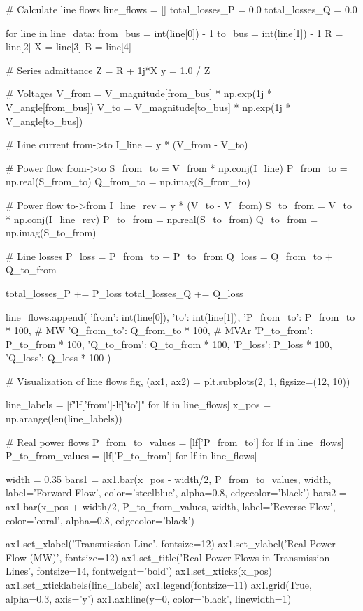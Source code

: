 \documentclass[11pt,a4paper]{article}
\begin{document}
\begin{pycode}
# Calculate line flows
line_flows = []
total_losses_P = 0.0
total_losses_Q = 0.0

for line in line_data:
    from_bus = int(line[0]) - 1
    to_bus = int(line[1]) - 1
    R = line[2]
    X = line[3]
    B = line[4]

    # Series admittance
    Z = R + 1j*X
    y = 1.0 / Z

    # Voltages
    V_from = V_magnitude[from_bus] * np.exp(1j * V_angle[from_bus])
    V_to = V_magnitude[to_bus] * np.exp(1j * V_angle[to_bus])

    # Line current from->to
    I_line = y * (V_from - V_to)

    # Power flow from->to
    S_from_to = V_from * np.conj(I_line)
    P_from_to = np.real(S_from_to)
    Q_from_to = np.imag(S_from_to)

    # Power flow to->from
    I_line_rev = y * (V_to - V_from)
    S_to_from = V_to * np.conj(I_line_rev)
    P_to_from = np.real(S_to_from)
    Q_to_from = np.imag(S_to_from)

    # Line losses
    P_loss = P_from_to + P_to_from
    Q_loss = Q_from_to + Q_to_from

    total_losses_P += P_loss
    total_losses_Q += Q_loss

    line_flows.append({
        'from': int(line[0]),
        'to': int(line[1]),
        'P_from_to': P_from_to * 100,  # MW
        'Q_from_to': Q_from_to * 100,  # MVAr
        'P_to_from': P_to_from * 100,
        'Q_to_from': Q_to_from * 100,
        'P_loss': P_loss * 100,
        'Q_loss': Q_loss * 100
    })

# Visualization of line flows
fig, (ax1, ax2) = plt.subplots(2, 1, figsize=(12, 10))

line_labels = [f"{lf['from']}-{lf['to']}" for lf in line_flows]
x_pos = np.arange(len(line_labels))

# Real power flows
P_from_to_values = [lf['P_from_to'] for lf in line_flows]
P_to_from_values = [lf['P_to_from'] for lf in line_flows]

width = 0.35
bars1 = ax1.bar(x_pos - width/2, P_from_to_values, width, label='Forward Flow',
                color='steelblue', alpha=0.8, edgecolor='black')
bars2 = ax1.bar(x_pos + width/2, P_to_from_values, width, label='Reverse Flow',
                color='coral', alpha=0.8, edgecolor='black')

ax1.set_xlabel('Transmission Line', fontsize=12)
ax1.set_ylabel('Real Power Flow (MW)', fontsize=12)
ax1.set_title('Real Power Flows in Transmission Lines', fontsize=14, fontweight='bold')
ax1.set_xticks(x_pos)
ax1.set_xticklabels(line_labels)
ax1.legend(fontsize=11)
ax1.grid(True, alpha=0.3, axis='y')
ax1.axhline(y=0, color='black', linewidth=1)


\end{pycode}
\end{document}
